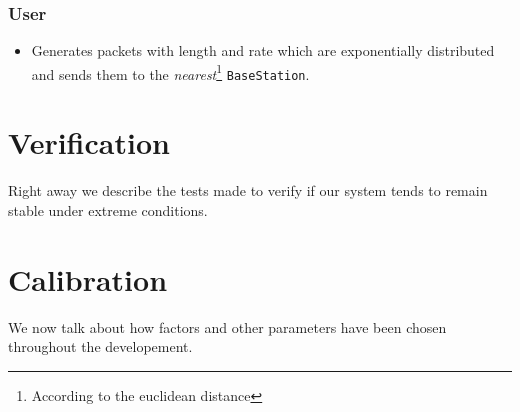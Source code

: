 \documentclass{article}
\begin{document}
\subsubsection{User}
\begin{itemize}
    \item Generates packets with length and rate which are exponentially distributed and sends them to the \textit{nearest}\footnote{According to the euclidean distance}
    \texttt{BaseStation}.
\end{itemize}

\newpage
\section{Verification}
Right away we describe the tests made to verify if our system tends to remain stable under extreme conditions.


\section{Calibration}
We now talk about how factors and other parameters have been chosen throughout the developement.

\end{document}

